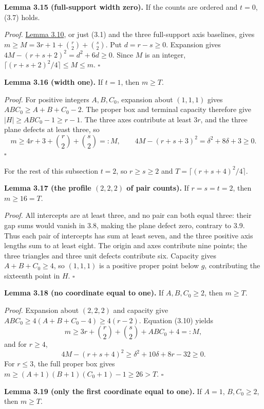\documentclass[11pt]{article}
\begin{document}
\label{res:A.19}
\textbf{Lemma 3.15 (full-support width zero).} If the counts are ordered and \(t=0\), (3.7) holds.

\emph{Proof.} \hyperref[res:A.9]{Lemma 3.10}, or just (3.1) and the three full-support axis baselines, gives \(m\ge M=3r+1+\binom r2+\binom s2\). Put \(d=r-s\ge0\). Expansion gives \(4M-(r+s+2)^2=d^2+6d\ge0\). Since \(M\) is an integer, \(\lceil(r+s+2)^2/4\rceil\le M\le m\). \ensuremath{\square}


\label{res:A12.1}
\textbf{Lemma 3.16 (width one).}
If $t=1$, then $m\ge T$.

\emph{Proof.}
For positive integers $A,B,C_0$, expansion about $(1,1,1)$ gives
$ABC_0\ge A+B+C_0-2$.  The proper box and terminal capacity therefore
give $|H|\ge ABC_0-1\ge r-1$.  The three axes contribute at least
$3r$, and the three plane defects at least three, so
\[
 m\ge4r+3+\binom r2+\binom s2=:M,\qquad
 4M-(r+s+3)^2=\delta^2+8\delta+3\ge0.
\]
\ensuremath{\square}

For the rest of this subsection $t=2$, so $r\ge s\ge2$ and
$T=\lceil(r+s+4)^2/4\rceil$.

\label{res:A12.2}
\textbf{Lemma 3.17 (the profile $(2,2,2)$ of pair counts).}
If $r=s=t=2$, then $m\ge16=T$.

\emph{Proof.}
All intercepts are at least three, and no pair can both equal three:
their gap sums would vanish in 3.8, making the plane defect zero,
contrary to 3.9.  Thus each pair of intercepts has sum at least seven,
and the three positive axis lengths sum to at least eight.
The origin and axes contribute nine points; the three triangles and
three unit defects contribute six.  Capacity gives
$A+B+C_0\ge4$, so $(1,1,1)$ is a positive proper point below $g$,
contributing the sixteenth point in $H$. \ensuremath{\square}

\label{res:A12.3}
\textbf{Lemma 3.18 (no coordinate equal to one).}
If $A,B,C_0\ge2$, then $m\ge T$.

\emph{Proof.}
Expansion about $(2,2,2)$ and capacity give
$ABC_0\ge4(A+B+C_0-4)\ge4(r-2)$.
Equation (3.10) yields
\[
 m\ge3r+\binom r2+\binom s2+ABC_0+4=:M,
\]
and for $r\ge4$,
\[
 4M-(r+s+4)^2\ge\delta^2+10\delta+8r-32\ge0.
\]
For $r\le3$, the full proper box gives
$m\ge(A+1)(B+1)(C_0+1)-1\ge26>T$.
\ensuremath{\square}

\label{res:A12.4}
\textbf{Lemma 3.19 (only the first coordinate equal to one).}
If $A=1$, $B,C_0\ge2$, then $m\ge T$.
\end{document}
